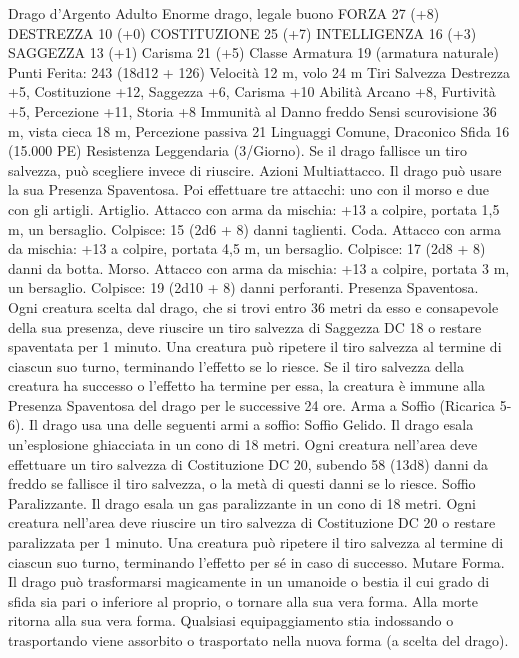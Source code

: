 \begin{multicols}{2}
Drago d’Argento Adulto
Enorme drago, legale buono
FORZA 27 (+8)
DESTREZZA 10 (+0)
COSTITUZIONE 25 (+7)
INTELLIGENZA 16 (+3)
SAGGEZZA 13 (+1)
Carisma 21 (+5)
Classe Armatura 19 (armatura naturale)
\hspace*{0pt}\hfill{Punti Ferita}: 243 (18d12 + 126)
Velocità 12 m, volo 24 m
Tiri Salvezza Destrezza +5, Costituzione +12, Saggezza +6,
Carisma +10
Abilità Arcano +8, Furtività +5, Percezione +11, Storia +8
Immunità al Danno freddo
Sensi scurovisione 36 m, vista cieca 18 m, Percezione passiva 21
Linguaggi Comune, Draconico
Sfida 16 (15.000 PE)
Resistenza Leggendaria (3/Giorno). Se il drago fallisce un tiro
salvezza, può scegliere invece di riuscire.
Azioni
Multiattacco. Il drago può usare la sua Presenza Spaventosa. Poi
effettuare tre attacchi: uno con il morso e due con gli artigli.
Artiglio. Attacco con arma da mischia: +13 a colpire, portata 1,5
m, un bersaglio.
Colpisce: 15 (2d6 + 8) danni taglienti.
Coda. Attacco con arma da mischia: +13 a colpire, portata 4,5
m, un bersaglio.
Colpisce: 17 (2d8 + 8) danni da botta.
Morso. Attacco con arma da mischia: +13 a colpire, portata 3 m,
un bersaglio.
Colpisce: 19 (2d10 + 8) danni perforanti.
Presenza Spaventosa. Ogni creatura scelta dal drago, che si trovi
entro 36 metri da esso e consapevole della sua presenza, deve
riuscire un tiro salvezza di Saggezza DC 18 o restare spaventata per
1 minuto. Una creatura può ripetere il tiro salvezza al termine di
ciascun suo turno, terminando l’effetto se lo riesce. Se il tiro salvezza
della creatura ha successo o l’effetto ha termine per essa, la creatura è
immune alla Presenza Spaventosa del drago per le successive 24 ore.
Arma a Soffio (Ricarica 5-6). Il drago usa una delle seguenti armi
a soffio:
Soffio Gelido. Il drago esala un’esplosione ghiacciata in un cono di
18 metri. Ogni creatura nell’area deve effettuare un tiro salvezza di
Costituzione DC 20, subendo 58 (13d8) danni da freddo se fallisce il
tiro salvezza, o la metà di questi danni se lo riesce.
Soffio Paralizzante. Il drago esala un gas paralizzante in un cono di
18 metri. Ogni creatura nell’area deve riuscire un tiro salvezza di
Costituzione DC 20 o restare paralizzata per 1 minuto. Una creatura
può ripetere il tiro salvezza al termine di ciascun suo turno,
terminando l’effetto per sé in caso di successo.
Mutare Forma. Il drago può trasformarsi magicamente in un
umanoide o bestia il cui grado di sfida sia pari o inferiore al proprio,
o tornare alla sua vera forma. Alla morte ritorna alla sua vera forma.
Qualsiasi equipaggiamento stia indossando o trasportando viene
assorbito o trasportato nella nuova forma (a scelta del drago).

\end{multicols}
